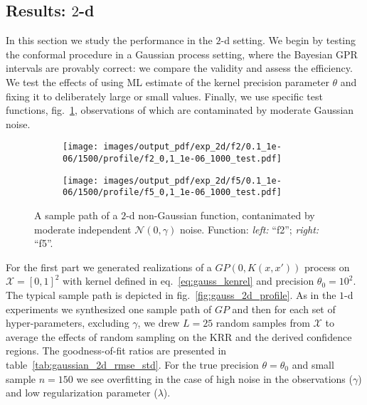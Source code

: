 \documentclass[a4paper,14pt]{extarticle}
\newcommand{\Ncal}{\mathcal{N}}
\newcommand{\Xcal}{\mathcal{X}}
\begin{document}

\subsection{Results: $2$-d} %
\label{sub:results_2_d}

In this section we study the performance in the $2$-d setting. We begin by testing
the conformal procedure in a Gaussian process setting, where the Bayesian GPR intervals
are provably correct: we compare the validity and assess the efficiency. We test
the effects of using ML estimate of the kernel precision parameter $\theta$ and
fixing it to deliberately large or small values. Finally, we use specific test functions,
fig.~\ref{fig:nongauss_2d_profile}, observations of which are contaminated by moderate
Gaussian noise.

\begin{figure}%
  \centering
  \begin{subfigure}[b]{0.5\linewidth}
    \texttt{[image: images/output\_pdf/exp\_2d/f2/0.1\_1e-06/1500/profile/f2\_0,1\_1e-06\_1000\_test.pdf]}
  \end{subfigure}%
  \begin{subfigure}[b]{0.5\linewidth}
    \texttt{[image: images/output\_pdf/exp\_2d/f5/0.1\_1e-06/1500/profile/f5\_0,1\_1e-06\_1000\_test.pdf]}
  \end{subfigure}
  \caption{A sample path of a $2$-d non-Gaussian function, contanimated by moderate
  independent $\Ncal(0, \gamma)$ noise. Function: \textit{left:} ``f2''; \textit{right:}
  ``f5''.}
  \label{fig:nongauss_2d_profile}
\end{figure}

For the first part we generated realizations of a $GP(0, K(x,x'))$ process on $\Xcal=[0,1]^2$
with kernel defined in eq.~\ref{eq:gauss_kenrel} and precision $\theta_0 = 10^2$.
The typical sample path is depicted in fig.~\ref{fig:gauss_2d_profile}. As in the
$1$-d experiments we synthesized one sample path of $GP$ and then for each set of
hyper-parameters, excluding $\gamma$, we drew $L=25$ random samples from $\Xcal$
to average the effects of random sampling on the KRR and the derived confidence regions.
The goodness-of-fit ratios are presented in table~\ref{tab:gaussian_2d_rmse_std}.
For the true precision $\theta=\theta_0$ and small sample $n=150$ we see overfitting
in the case of high noise in the observations ($\gamma$) and low regularization
parameter ($\lambda$).
\end{document}
